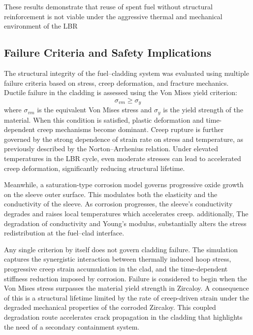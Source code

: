 These results demonstrate that reuse of spent fuel without structural reinforcement is not viable under the aggressive thermal and mechanical environment of the LBR

\subsection{Failure Criteria and Safety Implications}

The structural integrity of the fuel–cladding system was evaluated using multiple failure criteria based on stress, creep deformation, and fracture mechanics.
Ductile failure in the cladding is assessed using the Von Mises yield criterion:
\begin{equation}
    \sigma_{vm}\geq\sigma_y
\end{equation}
where $\sigma_{vm}$ is the equivalent Von Mises stress and $\sigma_y$ is the yield strength of the material. When this condition is satisfied, plastic deformation and time-dependent creep mechanisms become dominant.
Creep rupture is further governed by the strong dependence of strain rate on stress and temperature, as previously described by the Norton–Arrhenius relation. Under elevated temperatures in the LBR cycle, even moderate stresses can lead to accelerated creep deformation, significantly reducing structural lifetime.

Meanwhile, a saturation-type corrosion model governs progressive oxide growth on the sleeve outer surface. This modulates both the elasticity and the conductivity of the sleeve. As corrosion progresses, the sleeve's conductivity degrades and raises local temperatures which accelerates creep. additionally, The degradation of conductivity and Young's modulus, substantially alters the stress redistribution at the fuel--clad interface.

Any single criterion by itself does not govern cladding failure. The simulation captures the synergistic interaction between thermally induced hoop stress, progressive creep strain accumulation in the clad, and the time-dependent stiffness reduction imposed by corrosion. Failure is considered to begin when the Von Mises stress  surpasses the  material yield strength in Zircaloy. A consequence of this is a structural lifetime limited by the rate of creep-driven strain under the degraded mechanical properties of the corroded Zircaloy. This coupled degradation route accelerates crack propagation in the cladding that highlights the need of a secondary containment system.


